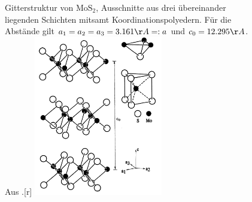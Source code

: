 \begin{figure}
  \begin{captionbeside}{Gitterstruktur von $\mathrm{MoS_2}$, Ausschnitte aus drei übereinander 
liegenden Schichten mitsamt Koordinationspolyedern. Für die Abstände gilt 
$a_1 = a_2 = a_3 = 3.161\AA =: a$ und $c_0 = 12.295\AA$. 
Aus \cite{schrocke1981mineralogie}.}[r]
    \includegraphics[width=0.5\textwidth]{pics/MoS2_structure}
  \end{captionbeside}
  \label{fig:MoS2_structure}
\end{figure} 
